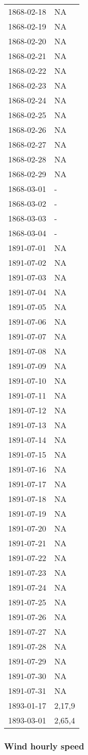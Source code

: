 \documentclass[]{article}
\begin{document}
\begin{longtable}[]{@{}ll@{}}
1868-02-18 & NA\tabularnewline
1868-02-19 & NA\tabularnewline
1868-02-20 & NA\tabularnewline
1868-02-21 & NA\tabularnewline
1868-02-22 & NA\tabularnewline
1868-02-23 & NA\tabularnewline
1868-02-24 & NA\tabularnewline
1868-02-25 & NA\tabularnewline
1868-02-26 & NA\tabularnewline
1868-02-27 & NA\tabularnewline
1868-02-28 & NA\tabularnewline
1868-02-29 & NA\tabularnewline
1868-03-01 & -\tabularnewline
1868-03-02 & -\tabularnewline
1868-03-03 & -\tabularnewline
1868-03-04 & -\tabularnewline
1891-07-01 & NA\tabularnewline
1891-07-02 & NA\tabularnewline
1891-07-03 & NA\tabularnewline
1891-07-04 & NA\tabularnewline
1891-07-05 & NA\tabularnewline
1891-07-06 & NA\tabularnewline
1891-07-07 & NA\tabularnewline
1891-07-08 & NA\tabularnewline
1891-07-09 & NA\tabularnewline
1891-07-10 & NA\tabularnewline
1891-07-11 & NA\tabularnewline
1891-07-12 & NA\tabularnewline
1891-07-13 & NA\tabularnewline
1891-07-14 & NA\tabularnewline
1891-07-15 & NA\tabularnewline
1891-07-16 & NA\tabularnewline
1891-07-17 & NA\tabularnewline
1891-07-18 & NA\tabularnewline
1891-07-19 & NA\tabularnewline
1891-07-20 & NA\tabularnewline
1891-07-21 & NA\tabularnewline
1891-07-22 & NA\tabularnewline
1891-07-23 & NA\tabularnewline
1891-07-24 & NA\tabularnewline
1891-07-25 & NA\tabularnewline
1891-07-26 & NA\tabularnewline
1891-07-27 & NA\tabularnewline
1891-07-28 & NA\tabularnewline
1891-07-29 & NA\tabularnewline
1891-07-30 & NA\tabularnewline
1891-07-31 & NA\tabularnewline
1893-01-17 & 2,17,9\tabularnewline
1893-03-01 & 2,65,4\tabularnewline
\bottomrule
\end{longtable}

\subsubsection{Wind hourly speed}\label{wind-hourly-speed}
\end{document}
